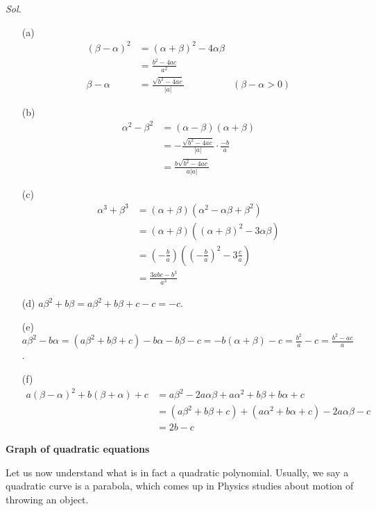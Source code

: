 \documentclass[12pt]{article}
\begin{document}
    \textit{ Sol.}\begin{enumerate}
        \item[(a)] \begin{align*}
            (\beta-\alpha)^2&=(\alpha+\beta)^2-4\alpha\beta\\
            &=\frac{b^2-4ac}{a^2}\\
            \beta-\alpha&=\frac{\sqrt{b^2-4ac}}{|a|}&(\beta-\alpha>0)
        \end{align*} 
        \item[(b)] \begin{align*}
            \alpha^2-\beta^2&=(\alpha-\beta)(\alpha+\beta)\\
            &=-\frac{\sqrt{b^2-4ac}}{|a|}\cdot \frac{-b}{a}\\
            &=\frac{b\sqrt{b^2-4ac}}{a|a|}
        \end{align*}
        \item[(c)] \begin{align*}
            \alpha^3+\beta^3&=(\alpha+\beta)(\alpha^2-\alpha\beta+\beta^2)\\
            &=(\alpha+\beta)((\alpha+\beta)^2-3\alpha\beta)\\
            &=(-\frac{b}{a})((-\frac{b}{a})^2-3\frac{c}{a})\\
            &=\frac{3abc-b^3}{a^3}
        \end{align*}
        \item[(d)] $a\beta^2+b\beta=a\beta^2+b\beta+c-c=-c$.
        \item[(e)] $\displaystyle a\beta^2-b\alpha=(a\beta^2+b\beta+c)-b\alpha-b\beta-c=-b(\alpha+\beta)-c=\frac{b^2}{a}-c=\frac{b^2-ac}{a}$.
        \item[(f)] \begin{align*}
            a(\beta-\alpha)^2+b(\beta+\alpha)+c&=a\beta^2-2a\alpha\beta+a\alpha^2+b\beta+b\alpha+c\\
            &=(a\beta^2+b\beta+c)+(a\alpha^2+b\alpha+c)-2a\alpha\beta-c\\
            &=2b-c
        \end{align*}
    \end{enumerate}

    \begin{center}
        \textbf{Graph of quadratic equations}
    \end{center}

    Let us now understand what is in fact a quadratic polynomial. Usually, we say a quadratic curve is a parabola, which comes up in Physics studies about motion of throwing an object.
\end{document}
